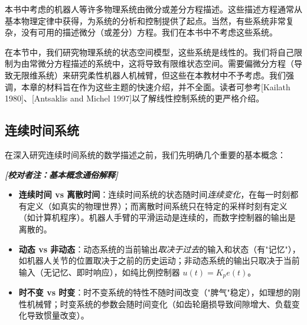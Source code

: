 \documentclass[UTF8,12pt,a4paper]{ctexart}
\theoremstyle{definition}
\begin{document}
本书中考虑的机器人等许多物理系统由微分或差分方程描述。这些描述方程通常从基本物理定律中获得，为系统的分析和控制提供了起点。当然，有些系统非常复杂，没有可用的描述微分（或差分）方程。我们在本书中不考虑这些系统。

在本节中，我们研究物理系统的状态空间模型，这些系统是线性的。我们将自己限制为由常微分方程描述的系统中，这将导致有限维状态空间。需要偏微分方程（导致无限维系统）来研究柔性机器人机械臂，但这些在本教材中不予考虑。我们强调，本章的材料旨在作为这些主题的快速介绍，并不全面。读者可参考[Kailath 1980]、[Antsaklis and Michel 1997]以了解线性控制系统的更严格介绍。

\subsection{连续时间系统}

在深入研究连续时间系统的数学描述之前，我们先明确几个重要的基本概念：

{\small\itshape
\hspace*{2em}\textbf{[校对者注：基本概念通俗解释]}
\begin{itemize}
    \item \textbf{连续时间 vs 离散时间}：连续时间系统的状态随时间\textit{连续变化}，在每一时刻都有定义（如真实的物理世界）；而离散时间系统只在特定的采样时刻有定义（如计算机程序）。机器人手臂的平滑运动是连续的，而数字控制器的输出是离散的。
    
    \item \textbf{动态 vs 非动态}：动态系统的当前输出\textit{取决于过去}的输入和状态（有"记忆"），如机器人关节的位置取决于之前的历史运动；非动态系统的输出只取决于当前输入（无记忆、即时响应），如纯比例控制器 $u(t) = K_p e(t)$。
    
    \item \textbf{时不变 vs 时变}：时不变系统的特性不随时间改变（"脾气"稳定），如理想的刚性机械臂；时变系统的参数会随时间变化（如齿轮磨损导致间隙增大、负载变化导致惯量改变）。
\end{itemize}
}
\end{document}
